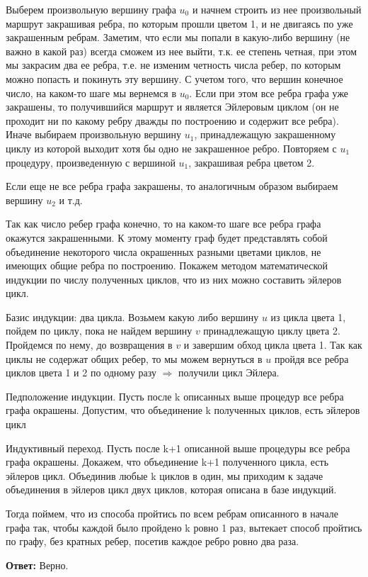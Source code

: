\documentclass{article}
\begin{document}
Выберем произвольную вершину графа $u_0$ и начнем строить из нее произвольный маршрут закрашивая ребра, по которым прошли цветом 1, и не двигаясь по уже закрашенным ребрам.
Заметим, что если мы попали в какую-либо вершину (не важно в какой раз) всегда сможем из нее выйти, т.к. ее степень четная, при этом мы закрасим два ее ребра, т.е. не изменим четность числа ребер, по которым можно попасть и покинуть эту вершину. С учетом того, что вершин конечное число,  на каком-то шаге мы вернемся в $u_0$. Если при этом все ребра графа уже закрашены, то получившийся маршрут и является Эйлеровым циклом (он не проходит ни по какому ребру дважды по построению и содержит все ребра). Иначе выбираем произвольную вершину $u_1$, принадлежащую закрашенному циклу из которой выходит хотя бы одно не закрашенное ребро. Повторяем с $u_1$  процедуру, произведенную с вершиной $u_1$, закрашивая ребра цветом 2.

Если еще не все ребра графа закрашены, то аналогичным образом выбираем вершину $u_2$ и т.д.

Так как число ребер графа конечно, то на каком-то шаге все ребра графа окажутся закрашенными. К этому моменту граф будет представлять собой объединение некоторого числа окрашенных разными цветами циклов, не имеющих общие ребра по построению.
Покажем методом математической индукции по числу полученных  циклов, что из них можно составить эйлеров цикл.

Базис индукции: два цикла.
Возьмем какую либо вершину $u$ из цикла цвета 1, пойдем по циклу, пока не найдем вершину $v$ принадлежащую циклу цвета 2. Пройдемся по нему, до возвращения в $v$ и завершим обход цикла цвета 1. Так как циклы не содержат общих ребер, то мы можем вернуться в $u$ пройдя все ребра циклов цвета 1 и 2 по одному разу $\Rightarrow$ получили цикл Эйлера. 

Педположение индукции.
Пусть после k описанных выше процедур все ребра графа окрашены.
Допустим, что  объединение k полученных  циклов, есть эйлеров цикл

Индуктивный переход.
Пусть после k+1 описанной выше процедуры все ребра графа окрашены. Докажем, что объединение k+1 полученного цикла, есть эйлеров цикл. Объединив любые k циклов в один, мы приходим к задаче объединения в эйлеров цикл двух циклов, которая описана в базе индукций.

Тогда поймем, что из способа пройтись по всем ребрам описанного в начале графа так, чтобы каждой было пройдено k
ровно 1 раз, вытекает способ пройтись по графу, без кратных ребер, посетив каждое ребро ровно два раза.

\textbf{Ответ:} Верно.
\end{document}
